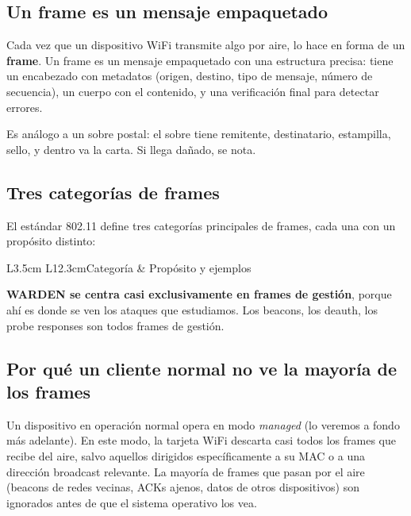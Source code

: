 \documentclass[11pt,a4paper]{article}
\begin{document}
\subsection{Un frame es un mensaje empaquetado}
Cada vez que un dispositivo WiFi transmite algo por aire, lo hace en
forma de un \textbf{frame}. Un frame es un mensaje empaquetado con una
estructura precisa: tiene un encabezado con metadatos (origen, destino,
tipo de mensaje, número de secuencia), un cuerpo con el contenido, y una
verificación final para detectar errores.

Es análogo a un sobre postal: el sobre tiene remitente, destinatario,
estampilla, sello, y dentro va la carta. Si llega dañado, se nota.

\subsection{Tres categorías de frames}
El estándar 802.11 define tres categorías principales de frames, cada una
con un propósito distinto:

\begin{datatable}{L{3.5cm} L{12.3cm}}{Categoría & Propósito y ejemplos}
\end{datatable}

\textbf{WARDEN se centra casi exclusivamente en frames de gestión}, porque
ahí es donde se ven los ataques que estudiamos. Los beacons, los deauth,
los probe responses son todos frames de gestión.

\subsection{Por qué un cliente normal no ve la mayoría de los frames}
Un dispositivo en operación normal opera en modo \emph{managed} (lo
veremos a fondo más adelante). En este modo, la tarjeta WiFi descarta
casi todos los frames que recibe del aire, salvo aquellos dirigidos
específicamente a su MAC o a una dirección broadcast relevante. La
mayoría de frames que pasan por el aire (beacons de redes vecinas, ACKs
ajenos, datos de otros dispositivos) son ignorados antes de que el sistema
operativo los vea.
\end{document}
